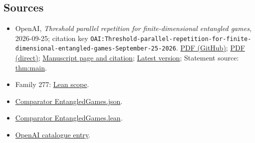 \documentclass[11pt]{article}
\begin{document}
\subsection{Sources}
\begin{itemize}
\item OpenAI, \emph{Threshold parallel repetition for finite-dimensional entangled games}, 2026-09-25; citation key \texttt{OAI:Threshold-parallel-repetition-for-finite-dimensional-entangled-games-September-25-2026}. \href{https://github.com/openai/math/blob/adc7f1241b42e322a6451854ab7e4b4c146bf78a/preprints/Threshold-parallel-repetition-for-finite-dimensional-entangled-games-September-25-2026/paper.pdf}{PDF (GitHub)}; \href{https://github.com/openai/math/raw/adc7f1241b42e322a6451854ab7e4b4c146bf78a/preprints/Threshold-parallel-repetition-for-finite-dimensional-entangled-games-September-25-2026/paper.pdf}{PDF (direct)}; \href{https://github.com/openai/math/blob/adc7f1241b42e322a6451854ab7e4b4c146bf78a/preprints/Threshold-parallel-repetition-for-finite-dimensional-entangled-games-September-25-2026/README.md}{Manuscript page and citation}; \href{https://github.com/openai/math/blob/main/preprints/Threshold-parallel-repetition-for-finite-dimensional-entangled-games-September-25-2026/paper.pdf}{Latest version}; Statement source: \href{https://github.com/openai/math/blob/adc7f1241b42e322a6451854ab7e4b4c146bf78a/preprints/Threshold-parallel-repetition-for-finite-dimensional-entangled-games-September-25-2026/build/sections/00-introduction.tex\#L50}{thm:main}.
\item Family 277: \href{https://github.com/openai/math/blob/adc7f1241b42e322a6451854ab7e4b4c146bf78a/lean/docs/277.md}{Lean scope}.
\item \href{https://github.com/openai/math/blob/adc7f1241b42e322a6451854ab7e4b4c146bf78a/lean/ComparatorChallenges/EntangledGames.json}{Comparator EntangledGames.json}.
\item \href{https://github.com/openai/math/blob/adc7f1241b42e322a6451854ab7e4b4c146bf78a/lean/ComparatorChallenges/EntangledGames.lean}{Comparator EntangledGames.lean}.
\item \href{https://github.com/openai/math/blob/adc7f1241b42e322a6451854ab7e4b4c146bf78a/CONTENTS.md}{OpenAI catalogue entry}.
\end{itemize}
\end{document}
